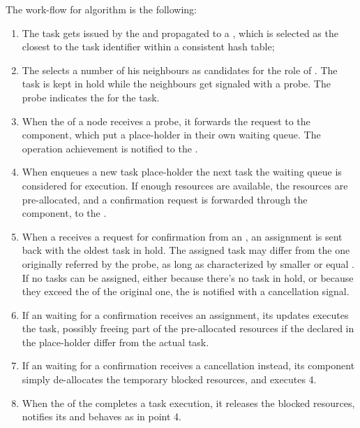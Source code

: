 \documentclass[conference]{IEEEtran}
\begin{document}
  The work-flow for \us algorithm is the following:

  \begin{enumerate}

    \item The task gets issued by the \dc and propagated to a \tmast,
      which is selected as the closest to the task identifier within a
      consistent hash table;

    \item The \tmast selects a number of his neighbours as candidates for
      the role of \exc. The task is kept in hold while the neighbours get
      signaled with a probe. The probe indicates the \treq for the task.

    \item When the \ResourceManager of a node receives a probe, it
      forwards the request to the \RmWorker component, which put a
      place-holder in their own waiting queue. The operation achievement
      is notified to the \tmast.

    \item When \RmWorker enqueues a new task place-holder the next task
      the waiting queue is considered for execution. If enough resources
      are available, the \treq resources are pre-allocated, and a
      confirmation request is forwarded through the \ResourceManager
      component, to the \tmast.

    \item When a \tmast receives a request for confirmation from an \exc,
      an assignment is sent back with the oldest task in hold.
      The assigned task may differ from the one originally referred by the
      probe, as long as characterized by smaller or equal \treq. If
      no tasks can be assigned, either because there's no task in hold, or
      because they exceed the \treq of the original one, the \exc is
      notified with a cancellation signal.

    \item If an \exc waiting for a confirmation receives an assignment,
      its \RmWorker updates executes the task, possibly freeing part of
      the pre-allocated resources if the \treq declared in the
      place-holder differ from the actual task.

    \item If an \exc waiting for a confirmation receives a cancellation
      instead, its \RmWorker component simply de-allocates the temporary
      blocked resources, and executes 4.

    \item When the \RmWorker of the \exc completes a task execution, it
      releases the blocked resources, notifies its \ResourceManager and
      behaves as in point 4.

  \end{enumerate}
\end{document}
